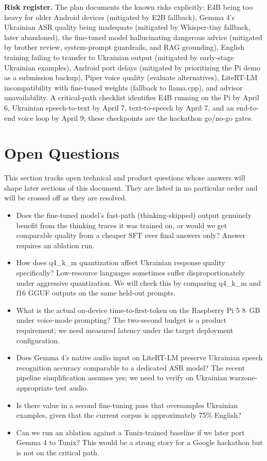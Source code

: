 \documentclass{article}
\theoremstyle{plain}
\theoremstyle{definition}
\theoremstyle{remark}
\begin{document}
\textbf{Risk register.} The plan documents the known risks explicitly: E4B being too heavy for older Android devices (mitigated by E2B fallback), Gemma 4's Ukrainian ASR quality being inadequate (mitigated by Whisper-tiny fallback, later abandoned), the fine-tuned model hallucinating dangerous advice (mitigated by brother review, system-prompt guardrails, and RAG grounding), English training failing to transfer to Ukrainian output (mitigated by early-stage Ukrainian examples), Android port delays (mitigated by prioritizing the Pi demo as a submission backup), Piper voice quality (evaluate alternatives), LiteRT-LM incompatibility with fine-tuned weights (fallback to llama.cpp), and advisor unavailability. A critical-path checklist identifies E4B running on the Pi by April 6, Ukrainian speech-to-text by April 7, text-to-speech by April 7, and an end-to-end voice loop by April 9; these checkpoints are the hackathon go/no-go gates.

\section{Open Questions}

This section tracks open technical and product questions whose answers will shape later sections of this document. They are listed in no particular order and will be crossed off as they are resolved.

\begin{itemize}
\item[$\square$] Does the fine-tuned model's fast-path (thinking-skipped) output genuinely benefit from the thinking traces it was trained on, or would we get comparable quality from a cheaper SFT over final answers only? Answer requires an ablation run.
\item[$\square$] How does q4\_k\_m quantization affect Ukrainian response quality specifically? Low-resource languages sometimes suffer disproportionately under aggressive quantization. We will check this by comparing q4\_k\_m and f16 GGUF outputs on the same held-out prompts.
\item[$\square$] What is the actual on-device time-to-first-token on the Raspberry Pi 5 8~GB under voice-mode prompting? The two-second budget is a product requirement; we need measured latency under the target deployment configuration.
\item[$\square$] Does Gemma 4's native audio input on LiteRT-LM preserve Ukrainian speech recognition accuracy comparable to a dedicated ASR model? The recent pipeline simplification assumes yes; we need to verify on Ukrainian warzone-appropriate test audio.
\item[$\square$] Is there value in a second fine-tuning pass that oversamples Ukrainian examples, given that the current corpus is approximately 75\% English?
\item[$\square$] Can we run an ablation against a Tunix-trained baseline if we later port Gemma 4 to Tunix? This would be a strong story for a Google hackathon but is not on the critical path.
\end{itemize}
\end{document}
